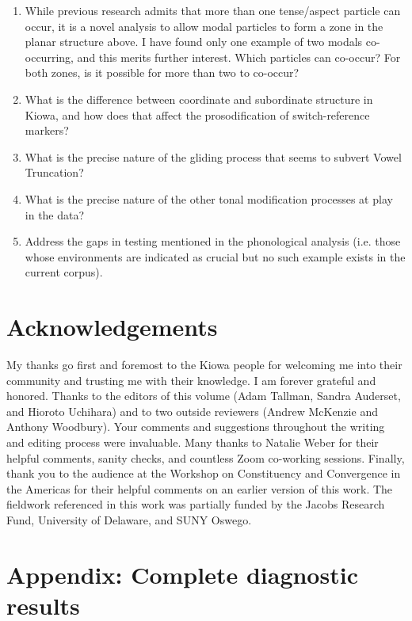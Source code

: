 \documentclass[output=paper]{langscibook}
\begin{document}
\begin{enumerate}
    \item While previous research admits that more than one tense/aspect particle can occur, it is a novel analysis to allow modal particles to form a zone in the planar structure above. I have found only one example of two modals co-occurring, and this merits further interest. Which particles can co-occur? For both zones, is it possible for more than two to co-occur?
    \item What is the difference between coordinate and subordinate structure in Kiowa, and how does that affect the prosodification of switch-reference markers? 
    \item What is the precise nature of the gliding process that seems to subvert Vowel Truncation? 
    \item What is the precise nature of the other tonal modification processes at play in the data? 
    \item Address the gaps in testing mentioned in the phonological analysis (i.e. those whose environments are indicated as crucial but no such example exists in the current corpus). 
\end{enumerate}


\section*{Acknowledgements}

My thanks go first and foremost to the Kiowa people for welcoming me into their community and trusting me with their knowledge. I am forever grateful and honored. Thanks to the editors of this volume (Adam Tallman, Sandra Auderset, and Hioroto Uchihara) and to two outside reviewers (Andrew McKenzie and Anthony Woodbury). Your comments and suggestions throughout the writing and editing process were invaluable. Many thanks to Natalie Weber for their helpful comments, sanity checks, and countless Zoom co-working sessions. Finally, thank you to the audience at the Workshop on Constituency and Convergence in the Americas for their helpful comments on an earlier version of this work. The fieldwork referenced in this work was partially funded by the Jacobs Research Fund, University of Delaware, and SUNY Oswego. 

\newpage
\printglossary

\printbibliography[heading=subbibliography,notkeyword=this]

\newpage
\section*{Appendix: Complete diagnostic results}
\end{document}
